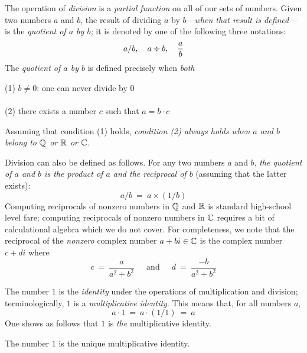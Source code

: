 The operation of {\it division} is a {\em
  partial function} on all of our sets of numbers.  Given two numbers
$a$ and $b$, the result of dividing $a$ by $b$---{\em when that result
  is defined}---is the {\it quotient of $a$ by $b$;}
it is denoted by one of the following three notations:
\[  a/b, \ \ \ a \div b, \ \ \ {a \over b}  \]
The {\it quotient of $a$ by $b$} is defined precisely when {\em both}

\noindent
\hspace*{.35in}(1) $b \neq 0$: one can never divide by $0$ \\
\hspace*{.35in}{\em and} \\
\hspace*{.35in}(2) there exists a number $c$ such that $a = b \cdot c$

\noindent
Assuming that condition (1) holds, {\em condition (2) always holds
  when $a$ and $b$ belong to $\mathbb{Q}$ or $\mathbb{R}$ or $\mathbb{C}$}.

Division can also be defined as follows.  For any two numbers $a$
and $b$, {\em the quotient of $a$ and $b$ is the product of $a$ and the
reciprocal of $b$} (assuming that the latter exists):
\[ a/b \ = \ a \times (1/b) \]
Computing reciprocals of nonzero numbers in $\mathbb{Q}$ and $\mathbb{R}$ is standard
high-school level fare; computing reciprocals of nonzero numbers in
$\mathbb{C}$ requires a bit of calculational algebra which we do not cover.
For completeness, we note that the reciprocal of the {\em nonzero}
complex number $a + bi \in \mathbb{C}$ is the complex number $c+di$ where
\[ c \ = \ \frac{a}{a^2 + b^2} \ \ \ \ \
\mbox{ and } \ \ \ \ \
d \ = \ \frac{-b}{a^2 + b^2}
\]

\medskip

%
The number $1$ is the {\it identity} under the operations of
multiplication and division;
\index{number!identity under multiplication}
terminologically, $1$ is a {\it multiplicative identity}.  This means
that, for all numbers $a$,
\[ a \cdot 1 \ = \ a \cdot (1/1) \ = \ a \]
One shows as follows that $1$ is {\em the} multiplicative identity.

\begin{prop}
\label{thm:unique-mult-iden}
The number $1$ is the unique multiplicative identity.
\end{prop}

